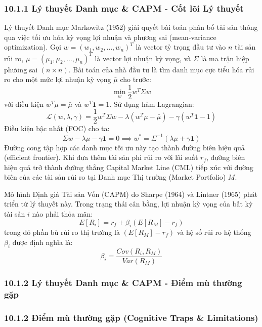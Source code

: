 \documentclass[
]{article}
\begin{document}
\subsubsection{10.1.1 Lý thuyết Danh mục \& CAPM - Cốt lõi Lý
thuyết}\label{luxfd-thuyux1ebft-danh-mux1ee5c-capm---cux1ed1t-luxf5i-luxfd-thuyux1ebft}

Lý thuyết Danh mục Markowitz (1952) giải quyết bài toán phân bổ tài sản
thông qua việc tối ưu hóa kỳ vọng lợi nhuận và phương sai (mean-variance
optimization). Gọi \(w = (w_1, w_2, \dots, w_n)^T\) là vector tỷ trọng
đầu tư vào \(n\) tài sản rủi ro,
\(\mu = (\mu_1, \mu_2, \dots, \mu_n)^T\) là vector lợi nhuận kỳ vọng, và
\(\Sigma\) là ma trận hiệp phương sai \((n \times n)\). Bài toán của nhà
đầu tư là tìm danh mục cực tiểu hóa rủi ro cho một mức lợi nhuận kỳ vọng
\(\bar{\mu}\) cho trước: \[ \min_{w} \frac{1}{2} w^T \Sigma w \] với
điều kiện \(w^T \mu = \bar{\mu}\) và \(w^T \mathbf{1} = 1\). Sử dụng hàm
Lagrangian:
\[ \mathcal{L}(w, \lambda, \gamma) = \frac{1}{2} w^T \Sigma w - \lambda (w^T \mu - \bar{\mu}) - \gamma (w^T \mathbf{1} - 1) \]
Điều kiện bậc nhất (FOC) cho ta:
\[ \Sigma w - \lambda \mu - \gamma \mathbf{1} = 0 \implies w^* = \Sigma^{-1} (\lambda \mu + \gamma \mathbf{1}) \]
Đường cong tập hợp các danh mục tối ưu này tạo thành đường biên hiệu quả
(efficient frontier). Khi đưa thêm tài sản phi rủi ro với lãi suất
\(r_f\), đường biên hiệu quả trở thành đường thẳng Capital Market Line
(CML) tiếp xúc với đường biên của các tài sản rủi ro tại Danh mục Thị
trường (Market Portfolio) \(M\).

Mô hình Định giá Tài sản Vốn (CAPM) do Sharpe (1964) và Lintner (1965)
phát triển từ lý thuyết này. Trong trạng thái cân bằng, lợi nhuận kỳ
vọng của bất kỳ tài sản \(i\) nào phải thỏa mãn:
\[ E[R_i] = r_f + \beta_i (E[R_M] - r_f) \] trong đó phần bù rủi ro thị
trường là \((E[R_M] - r_f)\) và hệ số rủi ro hệ thống \(\beta_i\) được
định nghĩa là: \[ \beta_i = \frac{Cov(R_i, R_M)}{Var(R_M)} \]

\subsubsection{10.1.2 Lý thuyết Danh mục \& CAPM - Điểm mù thường
gặp}\label{luxfd-thuyux1ebft-danh-mux1ee5c-capm---ux111iux1ec3m-muxf9-thux1b0ux1eddng-gux1eb7p}

\subsubsection{10.1.2 Điểm mù thường gặp (Cognitive Traps \&
Limitations)}\label{ux111iux1ec3m-muxf9-thux1b0ux1eddng-gux1eb7p-cognitive-traps-limitations-76}
\end{document}
